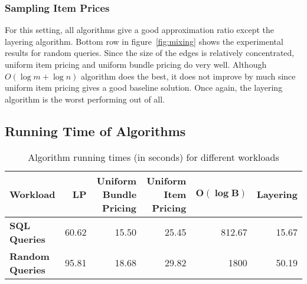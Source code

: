 \subsubsection{Sampling Item Prices} For this setting, all algorithms give a good approximation ratio except the layering algorithm. Bottom row in figure~\ref*{fig:mixing} shows the experimental results for random queries. Since the size of the edges is relatively concentrated, uniform item pricing and uniform bundle pricing do very well. Although $O(\log m + \log n)$ algorithm does the best, it does not improve by much since uniform item pricing gives a good baseline solution.  Once again, the layering algorithm is the worst performing out of all.


\subsection{Running Time of Algorithms}

\begin{table*}[] \centering
	\begin{small}
		\begin{tabular}{@{}lrrrrr@{}}\toprule
			\textbf{Workload} & \textbf{LP} & \textbf{Uniform Bundle Pricing} & \textbf{Uniform Item Pricing} & $\mathbf{O(\log B)}$ & \textbf{Layering}  \\ \midrule
			
			\textbf{SQL Queries} &  60.62 & 15.50 & 25.45 & 812.67 & 15.67 \\ \hdashline
			\textbf{Random Queries} &  95.81 & 18.68 &  29.82 &1800 & 50.19 \\
			\bottomrule
		\end{tabular}
	\end{small}
	\caption{Algorithm running times (in seconds) for different workloads}
	\label{table:runtime}
\end{table*}

